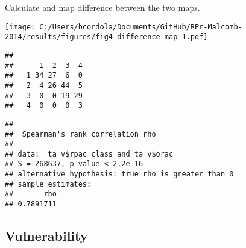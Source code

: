 \documentclass[
]{article}
\begin{document}
Calculate and map difference between the two maps.

\texttt{[image: C:/Users/bcordola/Documents/GitHub/RPr-Malcomb-2014/results/figures/fig4-difference-map-1.pdf]}

\begin{verbatim}
##    
##      1  2  3  4
##   1 34 27  6  0
##   2  4 26 44  5
##   3  0  0 19 29
##   4  0  0  0  3
\end{verbatim}

\begin{verbatim}
## 
##  Spearman's rank correlation rho
## 
## data:  ta_v$rpac_class and ta_v$orac
## S = 268637, p-value < 2.2e-16
## alternative hypothesis: true rho is greater than 0
## sample estimates:
##       rho 
## 0.7891711
\end{verbatim}

\hypertarget{vulnerability}{%
\subsection{Vulnerability}\label{vulnerability}}
\end{document}
